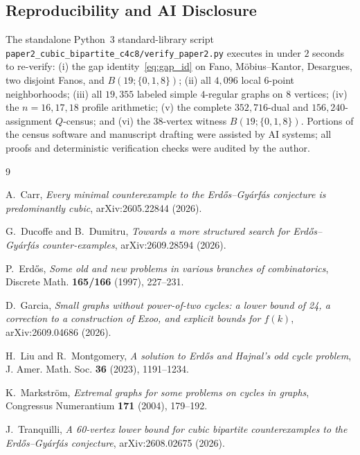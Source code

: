 \documentclass[11pt]{amsart}
\theoremstyle{definition}
\theoremstyle{remark}
\begin{document}
\subsection*{Reproducibility and AI Disclosure}
The standalone Python~3 standard-library script \texttt{paper2\_cubic\_bipartite\_c4c8/verify\_paper2.py} executes in under $2$ seconds to re-verify: (i) the gap identity~\eqref{eq:gap_id} on Fano, M\"obius--Kantor, Desargues, two disjoint Fanos, and $B(19;\{0,1,8\})$; (ii) all $4{,}096$ local $6$-point neighborhoods; (iii) all $19{,}355$ labeled simple $4$-regular graphs on $8$ vertices; (iv) the $n=16,17,18$ profile arithmetic; (v) the complete $352{,}716$-dual and $156{,}240$-assignment $Q$-census; and (vi) the $38$-vertex witness $B(19;\{0,1,8\})$. Portions of the census software and manuscript drafting were assisted by AI systems; all proofs and deterministic verification checks were audited by the author.

\begin{thebibliography}{9}

A.~Carr, \emph{Every minimal counterexample to the Erd\H{o}s--Gy\'arf\'as conjecture is predominantly cubic}, arXiv:2605.22844 (2026).

G.~Ducoffe and B.~Dumitru, \emph{Towards a more structured search for Erd\H{o}s--Gy\'arf\'as counter-examples}, arXiv:2609.28594 (2026).

P.~Erd\H{o}s, \emph{Some old and new problems in various branches of combinatorics}, Discrete Math. \textbf{165/166} (1997), 227--231.

D.~Garcia, \emph{Small graphs without power-of-two cycles: a lower bound of 24, a correction to a construction of Exoo, and explicit bounds for $f(k)$}, arXiv:2609.04686 (2026).

H.~Liu and R.~Montgomery, \emph{A solution to Erd\H{o}s and Hajnal's odd cycle problem}, J. Amer. Math. Soc. \textbf{36} (2023), 1191--1234.

K.~Markstr\"om, \emph{Extremal graphs for some problems on cycles in graphs}, Congressus Numerantium \textbf{171} (2004), 179--192.

J.~Tranquilli, \emph{A 60-vertex lower bound for cubic bipartite counterexamples to the Erd\H{o}s--Gy\'arf\'as conjecture}, arXiv:2608.02675 (2026).

\end{thebibliography}
\end{document}

